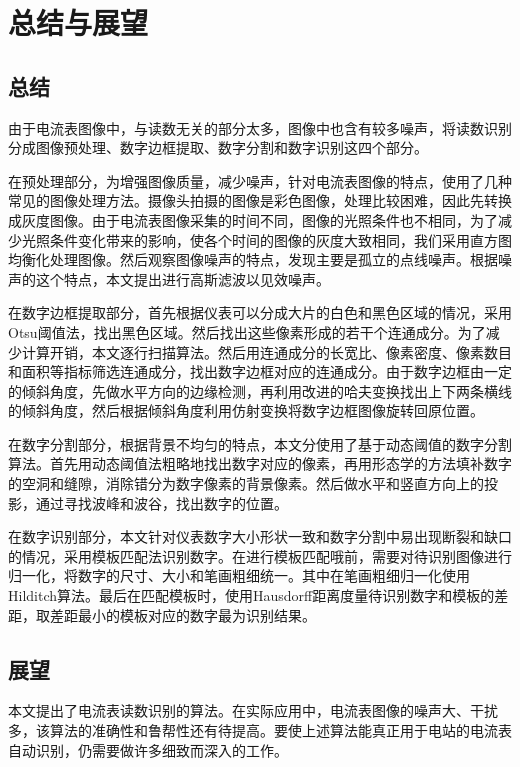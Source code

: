 
\chapter{总结与展望}

\section{总结}


由于电流表图像中，与读数无关的部分太多，图像中也含有较多噪声，将读数识别分成图像预处理、数字边框提取、数字分割和数字识别这四个部分。

在预处理部分，为增强图像质量，减少噪声，针对电流表图像的特点，使用了几种常见的图像处理方法。摄像头拍摄的图像是彩色图像，处理比较困难，因此先转换成灰度图像。由于电流表图像采集的时间不同，图像的光照条件也不相同，为了减少光照条件变化带来的影响，使各个时间的图像的灰度大致相同，我们采用直方图均衡化处理图像。然后观察图像噪声的特点，发现主要是孤立的点线噪声。根据噪声的这个特点，本文提出进行高斯滤波以见效噪声。

在数字边框提取部分，首先根据仪表可以分成大片的白色和黑色区域的情况，采用Otsu阈值法，找出黑色区域。然后找出这些像素形成的若干个连通成分。为了减少计算开销，本文逐行扫描算法。然后用连通成分的长宽比、像素密度、像素数目和面积等指标筛选连通成分，找出数字边框对应的连通成分。由于数字边框由一定的倾斜角度，先做水平方向的边缘检测，再利用改进的哈夫变换找出上下两条横线的倾斜角度，然后根据倾斜角度利用仿射变换将数字边框图像旋转回原位置。

在数字分割部分，根据背景不均匀的特点，本文分使用了基于动态阈值的数字分割算法。首先用动态阈值法粗略地找出数字对应的像素，再用形态学的方法填补数字的空洞和缝隙，消除错分为数字像素的背景像素。然后做水平和竖直方向上的投影，通过寻找波峰和波谷，找出数字的位置。

在数字识别部分，本文针对仪表数字大小形状一致和数字分割中易出现断裂和缺口的情况，采用模板匹配法识别数字。在进行模板匹配哦前，需要对待识别图像进行归一化，将数字的尺寸、大小和笔画粗细统一。其中在笔画粗细归一化使用Hilditch算法。最后在匹配模板时，使用Hausdorff距离度量待识别数字和模板的差距，取差距最小的模板对应的数字最为识别结果。

\section{展望}

本文提出了电流表读数识别的算法。在实际应用中，电流表图像的噪声大、干扰多，该算法的准确性和鲁帮性还有待提高。要使上述算法能真正用于电站的电流表自动识别，仍需要做许多细致而深入的工作。

